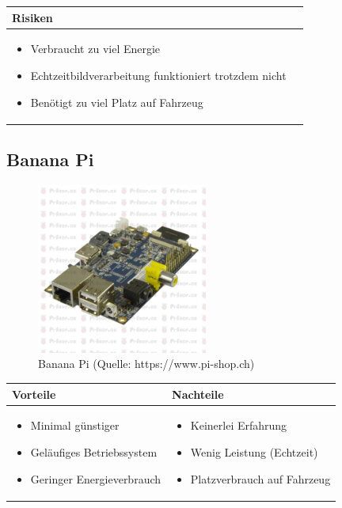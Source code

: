 \begin{table}[h]
\begin{tabular}{p{}p{}}


 \textbf{Risiken} & \\ \hline
	 
\begin{itemize}
\item Verbraucht zu viel Energie
\item Echtzeitbildverarbeitung funktioniert trotzdem nicht
\item Benötigt zu viel Platz auf Fahrzeug
\end{itemize}


 
\end{tabular}
\end{table}

\pagebreak

\subsection{Banana Pi}

\begin{figure}[h!]%
\centering
\includegraphics[width=0.5\textwidth]{fig/PIBanana.jpg}
\caption{Banana Pi (Quelle: https://www.pi-shop.ch)}
\label{fig:Banana Pi}
\end{figure}

\begin{table}[h]
\begin{tabular}{p{} | p{}}


 \textbf{Vorteile} & \textbf{Nachteile} \\ \hline
	 
\begin{itemize}
\item Minimal günstiger
\item Geläufiges Betriebssystem
\item Geringer Energieverbrauch
\end{itemize}

 
 &
 
\begin{itemize}
\item Keinerlei Erfahrung
\item Wenig Leistung (Echtzeit)
\item Platzverbrauch auf Fahrzeug
\end{itemize}

\end{tabular}
\end{table}


